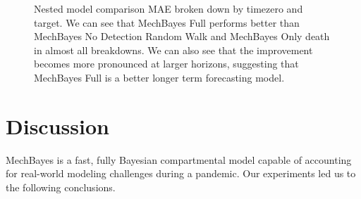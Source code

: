 \documentclass[11pt]{amsart}
\begin{document}
\begin{figure}
\caption{Nested model comparison MAE broken down by timezero and target. We can see that MechBayes Full performs better than MechBayes No Detection Random Walk and MechBayes Only death in almost all breakdowns. We can also see that the improvement becomes more pronounced at larger horizons, suggesting that MechBayes Full is a better longer term forecasting model.  }
\label{fig:ablation}
\end{figure}




\section{Discussion}

MechBayes is a fast, fully Bayesian compartmental model capable of accounting for real-world modeling challenges during a pandemic. Our experiments led us to the following conclusions.
\end{document}
